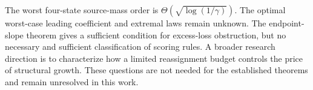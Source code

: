 \documentclass[11pt]{article}
\theoremstyle{remark}\newtheorem{remark}[theorem]{Remark}
\begin{document}
The worst four-state source-mass order is
$\Theta(\sqrt{\log(1/\gamma)})$. The optimal worst-case leading
coefficient and extremal laws remain unknown. The endpoint-slope theorem gives a
sufficient condition for excess-loss obstruction, but no necessary and
sufficient classification of scoring rules. A broader research direction
is to characterize how a limited reassignment budget controls the price
of structural growth. These questions are not needed for the established
theorems and remain unresolved in this work.

\clearpage
\begingroup
\small\raggedright


\endgroup
\end{document}
